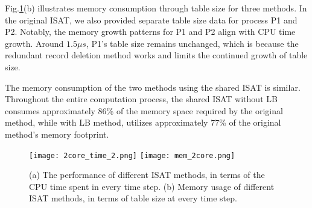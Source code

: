 Fig.\ref{MPI_2core}(b) illustrates memory consumption through table size for three methods. In the original ISAT, we also provided separate table size data for process P1 and P2. Notably, the memory growth patterns for P1 and P2 align with CPU time growth. Around $1.5 \mu s$, P1's table size remains unchanged, which is because the redundant record deletion method works and limits the continued growth of table size.

The memory consumption of the two methods using the shared ISAT is similar. Throughout the entire computation process, the shared ISAT without LB consumes approximately 86\% of the memory space required by the original method, while with LB method, utilizes approximately 77\% of the original method's memory footprint.




\begin{figure}[htbp]
	\centering
	\texttt{[image: 2core\_time\_2.png]}
	\texttt{[image: mem\_2core.png]}
	\caption{(a) The performance of different ISAT methods, in terms of the CPU time spent in every time step. (b) Memory usage of different ISAT methods, in terms of table size at every time step.}\label{MPI_2core}
\end{figure}

